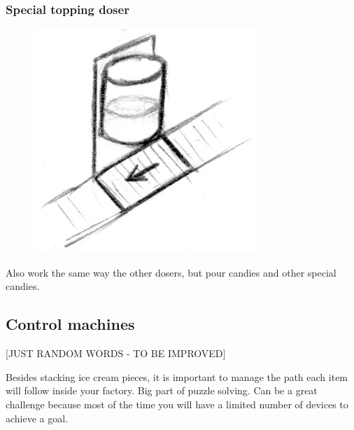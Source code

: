 \documentclass[a4paper]{scrartcl}
\begin{document}
        \subsubsection{Special topping doser}
            \begin{minipage}[t][6em][t]{\textwidth}
                \begin{figure}
                    \vspace{-20pt}
                    \includegraphics[scale=1]{devices/special_topping_doser}
                    \vspace{-20pt}
                \end{figure}

                Also work the same way the other dosers, but pour candies and
                other special candies.
            \end{minipage}

    \subsection{Control machines}
        $[$JUST RANDOM WORDS - TO BE IMPROVED$]$

        Besides stacking ice cream pieces, it is important to manage the path
        each item will follow inside your factory.
        Big part of puzzle solving.
        Can be a great challenge because most of the time you will have a
        limited number of devices to achieve a goal.
\end{document}

